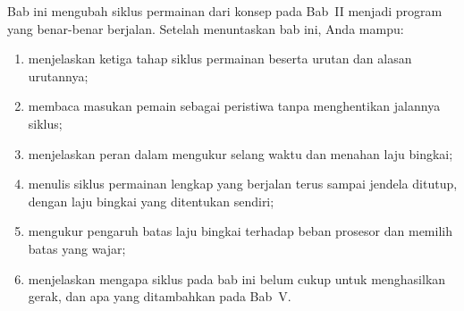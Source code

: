 \begin{tujuanbox}
Bab ini mengubah siklus permainan dari konsep pada Bab~II menjadi program yang
benar-benar berjalan. Setelah menuntaskan bab ini, Anda mampu:
\begin{enumerate}
  \item menjelaskan ketiga tahap siklus permainan beserta urutan dan alasan
        urutannya;
  \item membaca masukan pemain sebagai peristiwa tanpa menghentikan
        jalannya siklus;
  \item menjelaskan peran  dalam mengukur selang waktu
        dan menahan laju bingkai;
  \item menulis siklus permainan lengkap yang berjalan terus sampai jendela
        ditutup, dengan laju bingkai yang ditentukan sendiri;
  \item mengukur pengaruh batas laju bingkai terhadap beban prosesor dan
        memilih batas yang wajar;
  \item menjelaskan mengapa siklus pada bab ini belum cukup untuk menghasilkan
        gerak, dan apa yang ditambahkan pada Bab~V.
\end{enumerate}
\end{tujuanbox}
